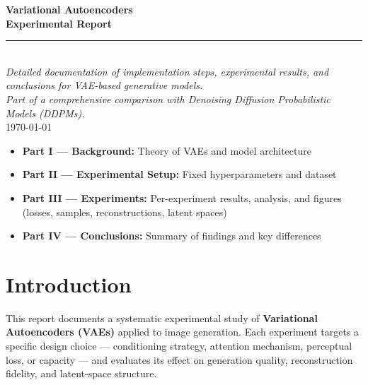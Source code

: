 \documentclass[12pt, a4paper]{article}
\begin{document}
\begin{titlepage}
    \centering
    \vspace*{2cm}
    {\Huge\bfseries\color{accent} Variational Autoencoders\\[0.4em]
     \Large Experimental Report}\\[1em]
    \rule{\linewidth}{0.6pt}\\[1.5em]
    {\large\itshape
     Detailed documentation of implementation steps, experimental results,
     and conclusions for VAE-based generative models.\\[0.6em]
     Part of a comprehensive comparison with Denoising Diffusion
     Probabilistic Models (DDPMs).}\\[3em]
    {\large \today}
    \vfill
    \begin{tcolorbox}[colback=boxbg, colframe=boxframe, width=0.85\linewidth,
                      arc=4pt, fonttitle=\bfseries,
                      title={Report Structure}]
        \begin{itemize}[leftmargin=1.2em]
            \item \textbf{Part I — Background:} Theory of VAEs and model architecture
            \item \textbf{Part II — Experimental Setup:} Fixed hyperparameters and dataset
            \item \textbf{Part III — Experiments:} Per-experiment results, analysis, and
                  figures (losses, samples, reconstructions, latent spaces)
            \item \textbf{Part IV — Conclusions:} Summary of findings and key differences
        \end{itemize}
    \end{tcolorbox}
\end{titlepage}

\tableofcontents
\newpage

\section{Introduction}
\label{sec:intro}

This report documents a systematic experimental study of
\textbf{Variational Autoencoders (VAEs)} applied to image generation.
Each experiment targets a specific design choice — conditioning
strategy, attention mechanism, perceptual loss, or capacity — and
evaluates its effect on generation quality, reconstruction fidelity,
and latent-space structure.
\end{document}
